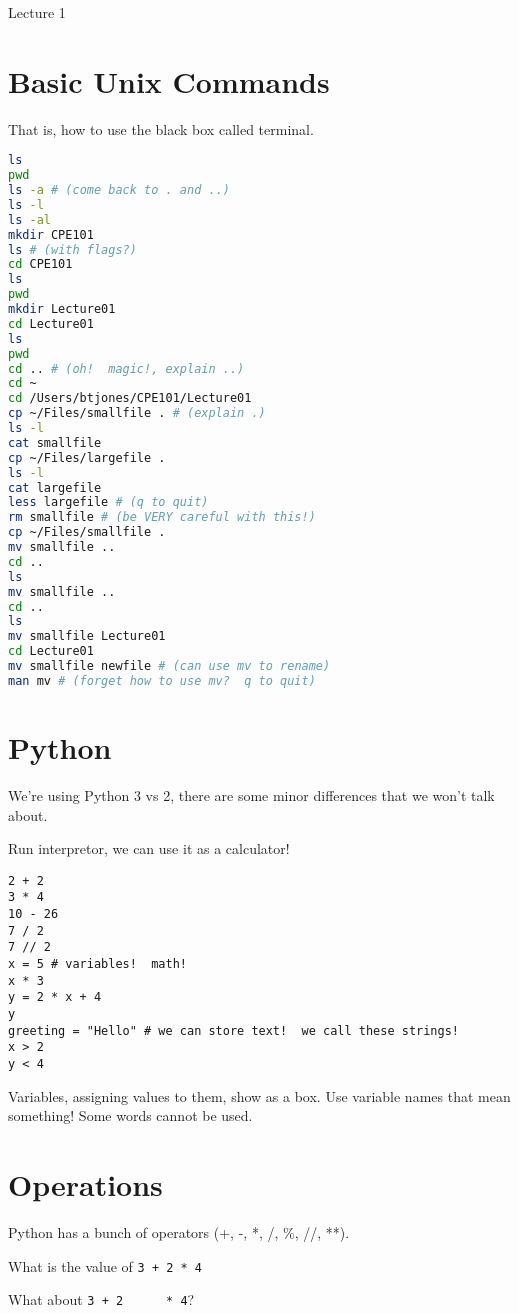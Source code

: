 \documentclass[12pt]{article}
\begin{document}
\begin{center}
   \LARGE Lecture 1
\end{center}
\section{Basic Unix Commands}

That is, how to use the black box called terminal.

\begin{lstlisting}[language=bash]
ls
pwd
ls -a # (come back to . and ..)
ls -l
ls -al
mkdir CPE101
ls # (with flags?)
cd CPE101
ls
pwd
mkdir Lecture01
cd Lecture01
ls
pwd
cd .. # (oh!  magic!, explain ..)
cd ~
cd /Users/btjones/CPE101/Lecture01
cp ~/Files/smallfile . # (explain .)
ls -l
cat smallfile
cp ~/Files/largefile .
ls -l
cat largefile
less largefile # (q to quit)
rm smallfile # (be VERY careful with this!)
cp ~/Files/smallfile .
mv smallfile ..
cd ..
ls
mv smallfile ..
cd ..
ls
mv smallfile Lecture01
cd Lecture01
mv smallfile newfile # (can use mv to rename)
man mv # (forget how to use mv?  q to quit)
\end{lstlisting}

\section{Python}

We're using Python 3 vs 2, there are some minor differences that we won't talk
about.

\noindent
Run interpretor, we can use it as a calculator!

\begin{lstlisting}
2 + 2
3 * 4
10 - 26
7 / 2
7 // 2
x = 5 # variables!  math!
x * 3
y = 2 * x + 4
y
greeting = "Hello" # we can store text!  we call these strings!
x > 2
y < 4
\end{lstlisting}

\noindent
Variables, assigning values to them, show as a box.  Use variable names that
mean something!  Some words cannot be used.

\section{Operations}

Python has a bunch of operators (+, -, *, /, \%, //, **).

\noindent
What is the value of \lstinline{3 + 2 * 4}

\noindent
What about \lstinline{3 + 2      * 4}?
\end{document}
